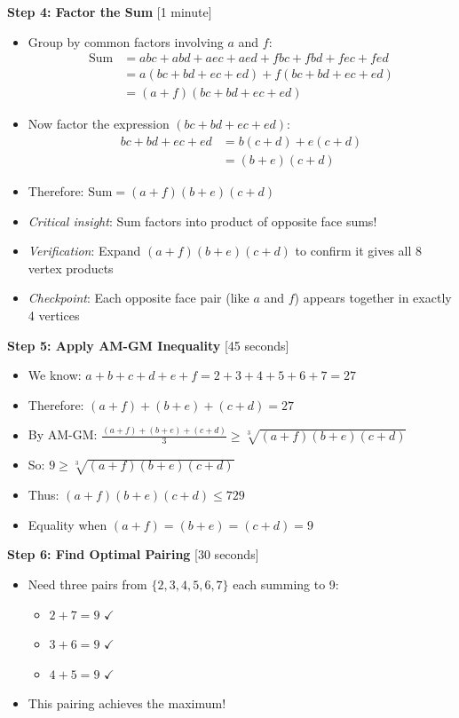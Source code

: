 \documentclass[]{article}
\begin{document}
\begin{solutionbox}
\textbf{Step 4: Factor the Sum} [1 minute]
\begin{itemize}
    \item Group by common factors involving $a$ and $f$:
    \begin{align*}
        \text{Sum} &= abc + abd + aec + aed + fbc + fbd + fec + fed \\
        &= a(bc + bd + ec + ed) + f(bc + bd + ec + ed) \\
        &= (a+f)(bc + bd + ec + ed)
    \end{align*}
    \item Now factor the expression $(bc + bd + ec + ed)$:
    \begin{align*}
        bc + bd + ec + ed &= b(c+d) + e(c+d) \\
        &= (b+e)(c+d)
    \end{align*}
    \item Therefore: $\boxed{\text{Sum} = (a+f)(b+e)(c+d)}$
    \item \textit{Critical insight}: Sum factors into product of opposite face sums!
    \item \textit{Verification}: Expand $(a+f)(b+e)(c+d)$ to confirm it gives all 8 vertex products
    \item \textit{Checkpoint}: Each opposite face pair (like $a$ and $f$) appears together in exactly 4 vertices
\end{itemize}

\textbf{Step 5: Apply AM-GM Inequality} [45 seconds]
\begin{itemize}
    \item We know: $a+b+c+d+e+f = 2+3+4+5+6+7 = 27$
    \item Therefore: $(a+f)+(b+e)+(c+d) = 27$
    \item By AM-GM: $\frac{(a+f)+(b+e)+(c+d)}{3} \geq \sqrt[3]{(a+f)(b+e)(c+d)}$
    \item So: $9 \geq \sqrt[3]{(a+f)(b+e)(c+d)}$
    \item Thus: $(a+f)(b+e)(c+d) \leq 729$
    \item Equality when $(a+f) = (b+e) = (c+d) = 9$
\end{itemize}

\textbf{Step 6: Find Optimal Pairing} [30 seconds]
\begin{itemize}
    \item Need three pairs from $\{2,3,4,5,6,7\}$ each summing to 9:
    \begin{itemize}
        \item $2+7 = 9$ $\checkmark$
        \item $3+6 = 9$ $\checkmark$
        \item $4+5 = 9$ $\checkmark$
    \end{itemize}
    \item This pairing achieves the maximum!
\end{itemize}


\end{solutionbox}
\end{document}
